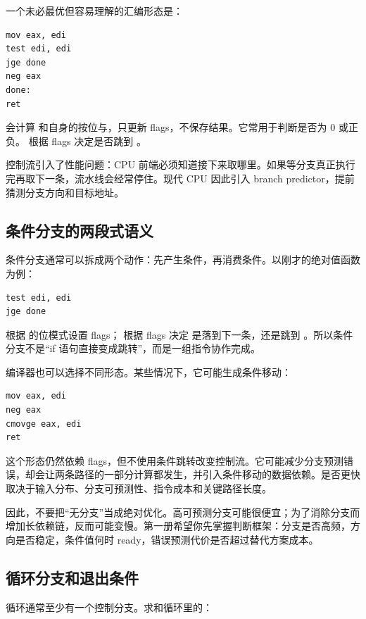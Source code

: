 一个未必最优但容易理解的汇编形态是：

\begin{lstlisting}
mov eax, edi
test edi, edi
jge done
neg eax
done:
ret
\end{lstlisting}

 会计算  和自身的按位与，只更新 flags，不保存结果。它常用于判断是否为 0 或正负。  根据 flags 决定是否跳到 。

控制流引入了性能问题：CPU 前端必须知道接下来取哪里。如果等分支真正执行完再取下一条，流水线会经常停住。现代 CPU 因此引入 branch predictor，提前猜测分支方向和目标地址。

\subsection{条件分支的两段式语义}

条件分支通常可以拆成两个动作：先产生条件，再消费条件。以刚才的绝对值函数为例：

\begin{lstlisting}
test edi, edi
jge done
\end{lstlisting}

 根据  的位模式设置 flags； 根据 flags 决定  是落到下一条，还是跳到 。所以条件分支不是“if 语句直接变成跳转”，而是一组指令协作完成。

编译器也可以选择不同形态。某些情况下，它可能生成条件移动：

\begin{lstlisting}
mov eax, edi
neg eax
cmovge eax, edi
ret
\end{lstlisting}

这个形态仍然依赖 flags，但不使用条件跳转改变控制流。它可能减少分支预测错误，却会让两条路径的一部分计算都发生，并引入条件移动的数据依赖。是否更快取决于输入分布、分支可预测性、指令成本和关键路径长度。

因此，不要把“无分支”当成绝对优化。高可预测分支可能很便宜；为了消除分支而增加长依赖链，反而可能变慢。第一册希望你先掌握判断框架：分支是否高频，方向是否稳定，条件值何时 ready，错误预测代价是否超过替代方案成本。

\subsection{循环分支和退出条件}

循环通常至少有一个控制分支。求和循环里的：

